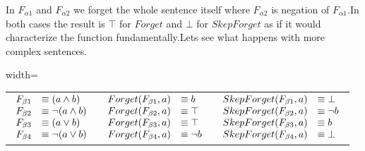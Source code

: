 In $F_{\alpha1}$ and $F_{\alpha2}$ we forget the whole sentence itself where $F_{\alpha2}$ is negation of $F_{\alpha1}$.In both cases the result is $\top$ for $Forget$ and $\bot$ for $SkepForget$ as if it would characterize the function fundamentally.Lets see what happens with more complex sentences.\\\begin{adjustbox}{width=\textwidth}
\begin{tabular}{| c | c | c |}
 &  &  \\
\hline
$\begin{array}{l l}
F_{\beta1} &\equiv (a \land b)\\
F_{\beta2} &\equiv \lnot (a \land b)\\
F_{\beta3} &\equiv (a \lor b)\\
F_{\beta4} &\equiv \lnot (a \lor b)\\
\end{array}$ & $\begin{array}{l l}
Forget(F_{\beta1},a) &\equiv b\\
Forget(F_{\beta2},a) &\equiv \top\\
Forget(F_{\beta3},a) &\equiv \top\\
Forget(F_{\beta4},a) &\equiv \lnot b\\
\end{array}$ & $\begin{array}{l l}
SkepForget(F_{\beta1},a) &\equiv \bot\\
SkepForget(F_{\beta2},a) &\equiv \lnot b\\
SkepForget(F_{\beta3},a) &\equiv b\\
SkepForget(F_{\beta4},a) &\equiv \bot\\
\end{array}$\\
\end{tabular}\
\end{adjustbox}\newline\newline
